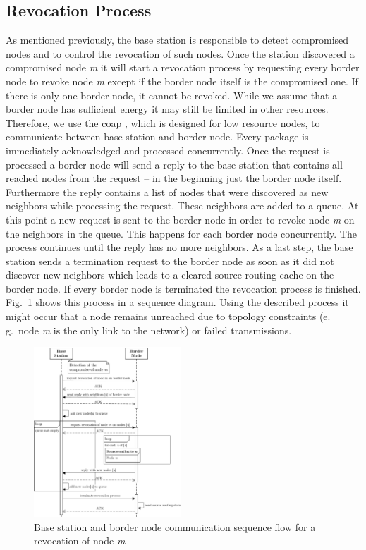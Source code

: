 \documentclass[conference]{IEEEtran}
\begin{document}
\subsection{Revocation Process}\label{sec:approach:revocation_process}
As mentioned previously, the base station is responsible to detect compromised nodes and to control the revocation of such nodes.
Once the station discovered a compromised node \textit{m} it will start a revocation process by requesting every border node to revoke node \textit{m} except if the border node itself is the compromised one.
If there is only one border node, it cannot be revoked.
While we assume that a border node has sufficient energy it may still be limited in other resources.
Therefore, we use the \acl{coap} \cite{rfc7252}, which is designed for low resource nodes, to communicate between base station and border node.
Every package is immediately acknowledged and processed concurrently.
Once the request is processed a border node will send a reply to the base station that contains all reached nodes from the request -- in the beginning just the border node itself.
Furthermore the reply contains a list of nodes that were discovered as new neighbors while processing the request.
These neighbors are added to a queue.
At this point a new request is sent to the border node in order to revoke node \textit{m} on the neighbors in the queue.
This happens for each border node concurrently.
The process continues until the reply has no more neighbors.
As a last step, the base station sends a termination request to the border node as soon as it did not discover new neighbors which leads to a cleared source routing cache on the border node.
If every border node is terminated the revocation process is finished.
Fig.~\ref{fig:base_station_sequence} shows this process in a sequence diagram.
Using the described process it might occur that a node remains unreached due to topology constraints (e.\,g.~node \textit{m} is the only link to the network)  or failed transmissions.
\begin{figure}[t]
	\centering
	\includegraphics[width=0.49\textwidth]{base_station_sequence}
	\caption{Base station and border node communication sequence flow for a revocation of node \textit{m}}
	\label{fig:base_station_sequence}
\end{figure}
\end{document}
